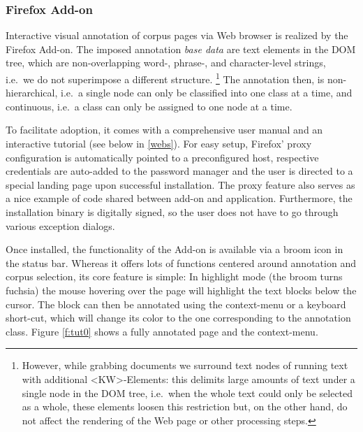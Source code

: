 \subsubsection{Firefox Add-on}

Interactive visual annotation of corpus pages via Web browser is realized by the {\KrdWrd} Firefox Add-on.
The imposed annotation \emph{base data} \cite{MuellerStrube2003} are text elements in the DOM tree, which are non-overlapping word\mbox{-,} phrase\mbox{-,} and character-level strings, i.e.~we do not superimpose a different structure.
\footnote{However, while grabbing documents we surround text nodes of running text with additional {<KW>-}Elements:
this delimits large amounts of text under a single node in the DOM tree,
i.e.~when the whole text could only be selected as a whole, these elements loosen this restriction but,
on the other hand, do not affect the rendering of the Web page or other processing steps.}
The annotation then, is non-hierarchical, i.e.~a single node can only be classified into one class at a time, and 
continuous, i.e.~a class can only be assigned to one node at a time. 

To facilitate adoption, it comes with a comprehensive user manual and an interactive tutorial (see below in \ref{webs}).
For easy setup, Firefox' proxy configuration is automatically pointed to a preconfigured host, respective credentials are auto-added to the password manager and the user is directed to a special landing page upon successful installation.
The proxy feature also serves as a nice example of code shared between add-on and application.
Furthermore, the installation binary is digitally signed, so the user does not have to go through various exception dialogs.

Once installed, the functionality of the Add-on is available via a broom icon in the status bar.
Whereas it offers lots of functions centered around annotation and corpus selection, its core feature is simple:
In highlight mode (the broom turns fuchsia) the mouse hovering over the page will highlight the text blocks below the cursor.
The block can then be annotated using the context-menu or a keyboard short-cut, which will change its color to the one corresponding to the annotation class.
Figure \ref{f:tut0} shows a fully annotated page and the context-menu.

